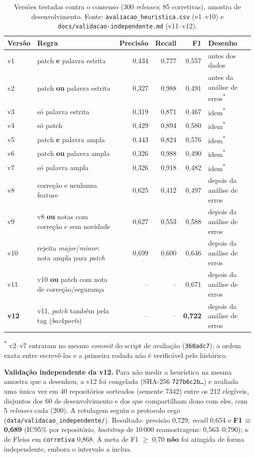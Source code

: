 \begin{table}[ht]
\centering
\caption{Versões testadas contra o consenso (300 \textit{releases}; 85 corretivas), amostra de
desenvolvimento. Fonte: \texttt{avaliacao\_heuristica.csv} (v1--v10) e \texttt{docs/validacao-independente.md}
(v11--v12).}
\begin{tabular}{lp{5.2cm}rrrp{2.6cm}}
\hline
Versão & Regra & Precisão & Recall & F1 & Desenho \\ \hline
v1 & patch \textbf{e} palavra estrita & 0,434 & 0,777 & 0,557 & antes dos dados \\
v2 & patch \textbf{ou} palavra estrita & 0,327 & 0,988 & 0,491 & antes da análise de erros\textsuperscript{*} \\
v3 & só palavra estrita & 0,319 & 0,871 & 0,467 & idem\textsuperscript{*} \\
v4 & só patch & 0,429 & 0,894 & 0,580 & idem\textsuperscript{*} \\
v5 & patch \textbf{e} palavra ampla & 0,443 & 0,824 & 0,576 & idem\textsuperscript{*} \\
v6 & patch \textbf{ou} palavra ampla & 0,326 & 0,988 & 0,490 & idem\textsuperscript{*} \\
v7 & só palavra ampla & 0,326 & 0,918 & 0,482 & idem\textsuperscript{*} \\
v8 & correção e nenhuma feature & 0,625 & 0,412 & 0,497 & depois da análise de erros \\
v9 & v8 \textbf{ou} notas com correção e sem novidade & 0,627 & 0,553 & 0,588 & depois da análise de erros \\
v10 & rejeita \textit{major}/\textit{minor}; nota ampla para \textit{patch} & 0,699 & 0,600 & 0,646 & depois da análise de erros \\
v11 & v10 \textbf{ou} patch com nota de correção/segurança & -- & -- & 0,671 & depois da análise de erros \\
\textbf{v12} & v11, \textit{patch} também pela tag (\textit{backports}) & -- & -- & \textbf{0,722} & depois da análise de erros \\ \hline
\end{tabular}
\par{\footnotesize \textsuperscript{*} v2--v7 entraram no mesmo \textit{commit} do script de avaliação
(\texttt{360adc7}); a ordem exata entre escrevê-las e a primeira rodada não é verificável pelo histórico.}
\end{table}

\textbf{Validação independente da v12.} Para não medir a heurística na mesma amostra que a desenhou, a v12
foi congelada (SHA-256 \texttt{727b6c2b\dots}) e avaliada uma única vez em 40 repositórios sorteados
(semente 7342) entre os 212 elegíveis, disjuntos dos 60 de desenvolvimento e dos que compartilham dono com
eles, com 5 \textit{releases} cada (200). A rotulagem seguiu o protocolo cego
(\texttt{data/validacao\_independente/}). Resultado: precisão 0,729, \textit{recall} 0,654 e
\textbf{F1 = 0,689} (IC95\% por repositório, \textit{bootstrap} de 10\,000 reamostragens: 0,563--0,790); $\kappa$ de
Fleiss em \texttt{corretiva} 0,868. A meta de F1 $\geq$ 0,70 \textbf{não} foi atingida de forma independente,
embora o intervalo a inclua.

